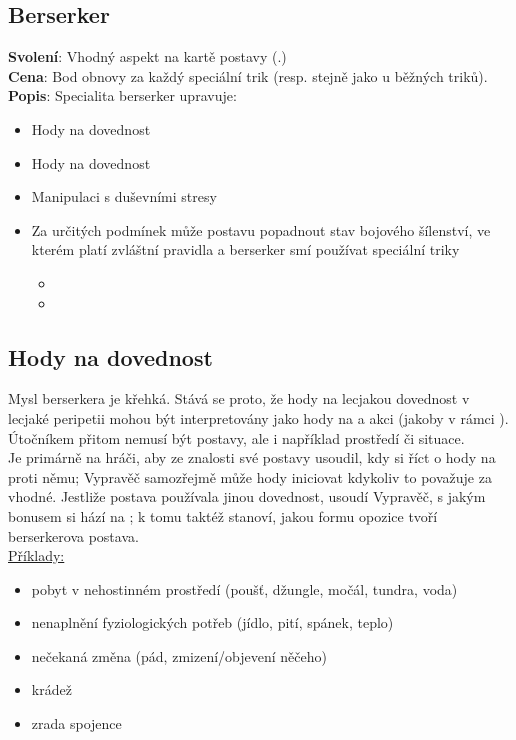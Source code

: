 \newpage
\begin{tcolorbox}[%
    enhanced, 
    breakable,
    skin first=enhanced,
    skin middle=enhanced,
    skin last=enhanced,
    ]{}
\section{Berserker}
\label{sec:berserker}
\textbf{Svolení}: Vhodný aspekt na kartě postavy (.)\\
\textbf{Cena}: Bod obnovy za každý speciální trik (resp. stejně jako u běžných triků).\\
\textbf{Popis}: Specialita berserker upravuje:
\begin{itemize}
    \item Hody na dovednost 
    \item Hody na dovednost 
    \item Manipulaci s duševními stresy
    \item Za určitých podmínek může postavu popadnout stav bojového šílenství, ve kterém platí zvláštní pravidla a berserker smí používat speciální triky
    \begin{itemize}
    \item {}
    \item {}
    \end{itemize}
\end{itemize}

\subsection*{Hody na dovednost }
Mysl berserkera je křehká. Stává se proto, že hody na lecjakou dovednost v lecjaké peripetii mohou být interpretovány jako hody na  a akci  (jakoby v rámci ). Útočníkem přitom nemusí být postavy, ale i například prostředí či situace. \\
Je primárně na hráči, aby ze znalosti své postavy usoudil, kdy si říct o hody na  proti němu; Vypravěč samozřejmě může hody iniciovat kdykoliv to považuje za vhodné. Jestliže postava používala jinou dovednost, usoudí Vypravěč, s jakým bonusem si hází na ; k tomu taktéž stanoví, jakou formu opozice tvoří berserkerova postava.\\

\underline{Příklady:}
\begin{itemize}
\item pobyt v nehostinném prostředí (poušť, džungle, močál, tundra, voda)
\item nenaplnění fyziologických potřeb (jídlo, pití, spánek, teplo)
\item nečekaná změna (pád, zmizení/objevení něčeho)
\item krádež
\item zrada spojence
\end{itemize}


\end{tcolorbox}
